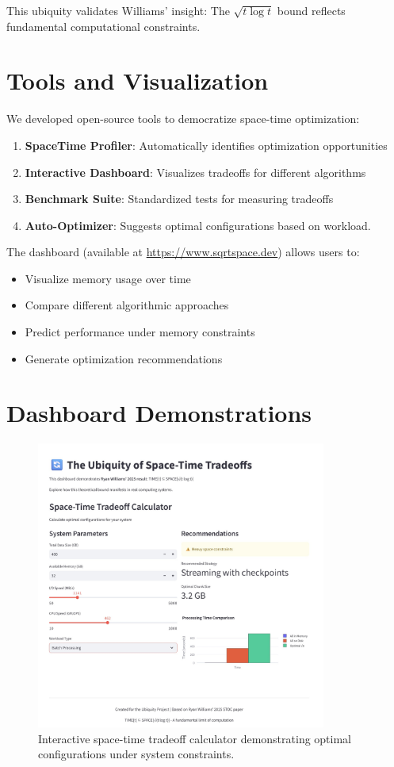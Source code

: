 \documentclass[11pt]{article}
\theoremstyle{definition}
\begin{document}
This ubiquity validates Williams' insight: The $\sqrt{t \log t}$ bound reflects fundamental computational constraints.

\section{Tools and Visualization}
\label{sec:tools}

We developed open-source tools to democratize space-time optimization:

\begin{enumerate}
\item \textbf{SpaceTime Profiler}: Automatically identifies optimization opportunities
\item \textbf{Interactive Dashboard}: Visualizes tradeoffs for different algorithms
\item \textbf{Benchmark Suite}: Standardized tests for measuring tradeoffs
\item \textbf{Auto-Optimizer}: Suggests optimal configurations based on workload.
\end{enumerate}

The dashboard (available at \url{https://www.sqrtspace.dev}) allows users to:
\begin{itemize}
\item Visualize memory usage over time
\item Compare different algorithmic approaches
\item Predict performance under memory constraints
\item Generate optimization recommendations
\end{itemize}
\newpage
\FloatBarrier
\section{Dashboard Demonstrations}
\label{sec:dashboard}

\begin{figure}[!htbp]
\centering
\includegraphics[width=0.85\textwidth]{figures/dashboard1.png}
\caption{Interactive space-time tradeoff calculator demonstrating optimal configurations under system constraints.}
\label{fig:calc_dashboard}
\end{figure}
\end{document}
